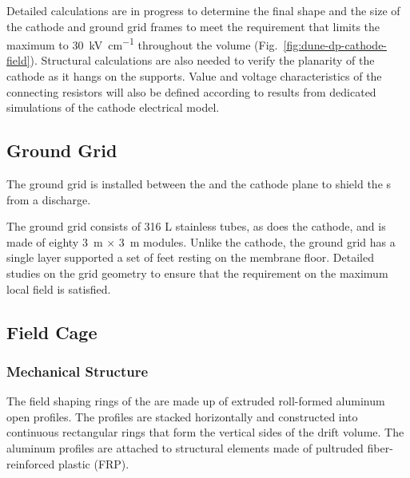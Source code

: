 Detailed calculations are in progress to determine the final shape and the size of the cathode and ground grid frames to meet the requirement that limits the maximum \efield to \SI{30}{\kV\per\cm}  
throughout the \lar volume (Fig.~\ref{fig:dune-dp-cathode-field}).  Structural calculations are also needed to verify the planarity of the cathode as it hangs on the \fc supports.
Value and voltage characteristics of the connecting resistors will also be defined according to results from dedicated simulations of the cathode electrical model.


\subsection{Ground Grid}
The ground grid is installed between the  and the cathode plane to shield the \pmt{}s from a discharge.  

The ground grid consists of 316 L stainless tubes, as does the cathode, and is made of eighty \SI{3}{\m} $\times$ \SI{3}{\m} modules. Unlike the cathode, the ground grid has a single layer supported a set of feet resting on the membrane floor.
Detailed studies on the grid geometry to ensure that the requirement on the maximum local field is satisfied.

\subsection{Field Cage}

\subsubsection{Mechanical Structure}
The field shaping rings of the \fc are made up of extruded roll-formed aluminum open profiles.  
The profiles are stacked horizontally and constructed into continuous rectangular rings that form the vertical sides of the drift volume. The aluminum profiles are attached to structural elements made of pultruded fiber-reinforced plastic (FRP). 


